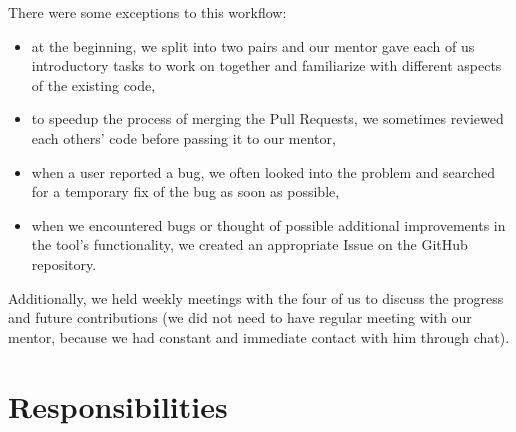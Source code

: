 \documentclass[licencjacka,en]{pracamgr}
\begin{document}
There were some exceptions to this workflow:
\begin{itemize}
	\item at the beginning, we split into two pairs and our mentor gave each of us introductory
		tasks to work on together and familiarize with different aspects of the existing code,
	\item to speedup the process of merging the Pull Requests, we sometimes reviewed each others'
		code before passing it to our mentor,
	\item when a user reported a bug, we often looked into the problem and searched for a temporary
		fix of the bug as soon as possible,
	\item when we encountered bugs or thought of possible additional improvements in the tool's
		functionality, we created an appropriate Issue on the GitHub repository.
\end{itemize}

Additionally, we held weekly meetings with the four of us to discuss the progress and future
contributions (we did not need to have regular meeting with our mentor, because we had constant
and immediate contact with him through chat).

\section{Responsibilities}
\end{document}
